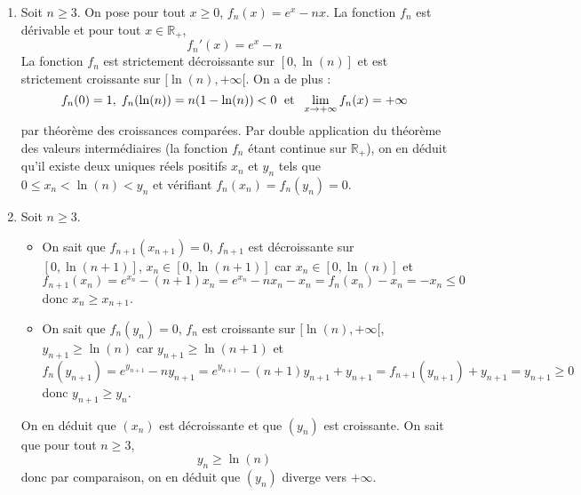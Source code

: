 \documentclass[a4paper,twoside,french,10pt]{VcCours}
\begin{document}
\begin{enumerate}
\item Soit $n \geq 3$. On pose pour tout $x \geq 0$, $f_n(x)=e^x-nx$. La fonction $f_n$ est dérivable et pour tout $x \in \mathbb{R}_+$,
$$ f_n'(x)=e^x-n$$
La fonction $f_n$ est strictement décroissante sur $[0, \ln(n)]$ et est strictement croissante sur $[\ln(n), + \infty[$. On a de plus :
$$ f_n(0)=1, \; f_n(\ln(n))=n(1- \ln(n))<0 \; \hbox{ et } \; \lim_{x \rightarrow + \infty} f_n(x) = + \infty$$
par théorème des croissances comparées. Par double application du théorème des valeurs intermédiaires (la fonction $f_n$ étant continue sur $\mathbb{R}_+$), on en déduit qu'il existe deux uniques réels positifs $x_n$ et $y_n$ tels que $0 \leq x_n < \ln(n) < y_n$ et vérifiant $f_n(x_n)=f_n(y_n)=0$.
\item Soit $n \geq 3$.
\begin{itemize}
\item On sait que $f_{n+1}(x_{n+1})=0$, $f_{n+1}$ est décroissante sur $[0, \ln(n+1)]$, $x_n \in [0, \ln(n+1)]$ car $x_n \in [0, \ln(n)]$ et 
$$ f_{n+1}(x_n) = e^{x_n} - (n+1)x_n = e^{x_n} - nx_n - x_n = f_n(x_n)- x_n = -x_n \leq 0$$
donc $x_n \geq x_{n+1}$.
\item On sait que $f_{n}(y_{n})=0$, $f_{n}$ est croissante sur $[\ln(n), + \infty[$, $y_{n+1} \geq \ln(n)$ car $y_{n+1} \geq \ln(n+1)$ et 
$$ f_{n}(y_{n+1}) = e^{y_{n+1}} - ny_{n+1} = e^{y_{n+1}}-(n+1)y_{n+1} + y_{n+1} = f_{n+1}(y_{n+1})+y_{n+1}= y_{n+1} \geq 0$$
donc $y_{n+1} \geq y_n$.
\end{itemize}
On en déduit que $(x_n)$ est décroissante et que $(y_n)$ est croissante. On sait que pour tout $n \geq 3$,
$$ y_n \geq \ln(n)$$
donc par comparaison, on en déduit que $(y_n)$ diverge vers $+ \infty$. 

\medskip


\end{enumerate}
\end{document}
